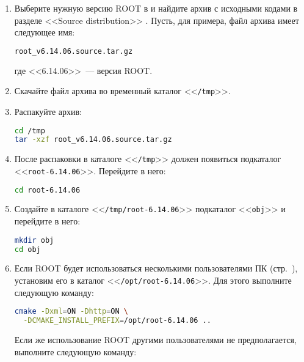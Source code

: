 \documentclass[12pt, a4paper, oneside, onecolumn]{book}
\newcommand{\ROOT}{\mbox{ROOT}}
\newcommand{\DIRECTORY}[1]{<<{\tt #1}>>}
\begin{document}
\begin{enumerate}

\item Выберите нужную версию \ROOT{} в \cite{RootDownload} и найдите архив с исходными кодами в разделе <<Source distribution>>  . Пусть, для примера, файл архива имеет следующее имя:

\begin{lstlisting}[language=bash]
root_v6.14.06.source.tar.gz
\end{lstlisting}
 
\noindent где <<6.14.06>>~--- версия \ROOT{}.

\item Скачайте файл архива во временный каталог \DIRECTORY{/tmp}.

\item Распакуйте архив:

\begin{lstlisting}[language=bash]
cd /tmp
tar -xzf root_v6.14.06.source.tar.gz
\end{lstlisting}

\item После распаковки в каталоге \DIRECTORY{/tmp} должен появиться подкаталог \DIRECTORY{root-6.14.06}. Перейдите в него:

\begin{lstlisting}[language=bash]
cd root-6.14.06
\end{lstlisting}

\item Создайте в каталоге \DIRECTORY{/tmp/root-6.14.06} подкаталог \DIRECTORY{obj} и перейдите в него:

\begin{lstlisting}[language=bash]
mkdir obj
cd obj
\end{lstlisting}

\item 
\label{item-select-root-dir}

Если \ROOT{} будет использоваться несколькими пользователями ПК (стр.~\pageref{sec_multiuser}), установим его в каталог \DIRECTORY{/opt/root-6.14.06}. Для этого выполните  следующую команду:

\begin{lstlisting}[language=bash]
cmake -Dxml=ON -Dhttp=ON \
  -DCMAKE_INSTALL_PREFIX=/opt/root-6.14.06 ..
\end{lstlisting}

Если же использование \ROOT{} другими пользователями не предполагается, выполните следующую команду:


\end{enumerate}
\end{document}

